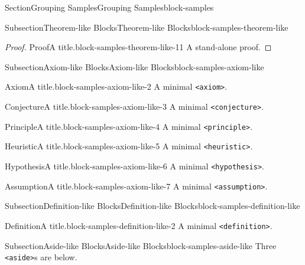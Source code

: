 \documentclass[twoside,10pt,]{article}
\newcommand{\mono}[1]{\texttt{#1}}
\numberwithin{equation}{section}
\begin{document}
\begin{sectionptx}{Section}{Grouping Samples}{}{Grouping Samples}{}{}{block-samples}
\begin{subsectionptx}{Subsection}{Theorem-like Blocks}{}{Theorem-like Blocks}{}{}{block-samples-theorem-like}
\begin{proof}{Proof}{A title.}{block-samples-theorem-like-11}
A stand-alone proof.%
\end{proof}
\end{subsectionptx}
%
%
\typeout{************************************************}
\typeout{************************************************}
%
\begin{subsectionptx}{Subsection}{Axiom-like Blocks}{}{Axiom-like Blocks}{}{}{block-samples-axiom-like}
\begin{axiom}{Axiom}{A title.}{}{block-samples-axiom-like-2}%
A minimal \mono{<axiom>}.%
\end{axiom}
\begin{conjecture}{Conjecture}{A title.}{}{block-samples-axiom-like-3}%
A minimal \mono{<conjecture>}.%
\end{conjecture}
\begin{principle}{Principle}{A title.}{}{block-samples-axiom-like-4}%
A minimal \mono{<principle>}.%
\end{principle}
\begin{heuristic}{Heuristic}{A title.}{}{block-samples-axiom-like-5}%
A minimal \mono{<heuristic>}.%
\end{heuristic}
\begin{hypothesis}{Hypothesis}{A title.}{}{block-samples-axiom-like-6}%
A minimal \mono{<hypothesis>}.%
\end{hypothesis}
\begin{assumption}{Assumption}{A title.}{}{block-samples-axiom-like-7}%
A minimal \mono{<assumption>}.%
\end{assumption}
\end{subsectionptx}
%
%
\typeout{************************************************}
\typeout{************************************************}
%
\begin{subsectionptx}{Subsection}{Definition-like Blocks}{}{Definition-like Blocks}{}{}{block-samples-definition-like}
\begin{definition}{Definition}{A title.}{block-samples-definition-like-2}%
A minimal \mono{<definition>}.%
\end{definition}
\end{subsectionptx}
%
%
\typeout{************************************************}
\typeout{************************************************}
%
\begin{subsectionptx}{Subsection}{Aside-like Blocks}{}{Aside-like Blocks}{}{}{block-samples-aside-like}
Three \mono{<aside>}s are below.%

\end{subsectionptx}
\end{sectionptx}
\end{document}

